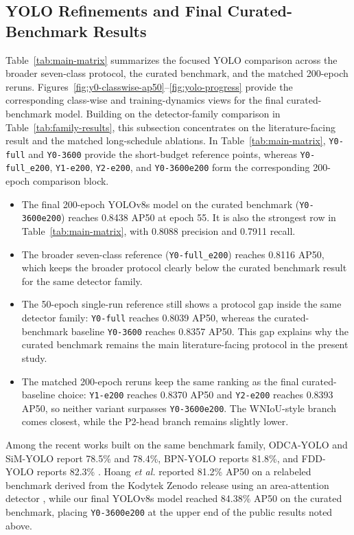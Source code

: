 \documentclass[10pt,a4paper]{article}
\begin{document}
\subsection{YOLO Refinements and Final Curated-Benchmark Results}
\label{sec:main-results}

Table~\ref{tab:main-matrix} summarizes the focused YOLO comparison across the broader seven-class protocol, the curated benchmark, and the matched 200-epoch reruns. Figures~\ref{fig:y0-classwise-ap50}--\ref{fig:yolo-progress} provide the corresponding class-wise and training-dynamics views for the final curated-benchmark model. Building on the detector-family comparison in Table~\ref{tab:family-results}, this subsection concentrates on the literature-facing result and the matched long-schedule ablations. In Table~\ref{tab:main-matrix}, \texttt{Y0-full} and \texttt{Y0-3600} provide the short-budget reference points, whereas \texttt{Y0-full\_e200}, \texttt{Y1-e200}, \texttt{Y2-e200}, and \texttt{Y0-3600e200} form the corresponding 200-epoch comparison block.

\begin{itemize}[leftmargin=1.5em]
  \item The final 200-epoch YOLOv8s model on the curated benchmark (\texttt{Y0-3600e200}) reaches 0.8438 AP50 at epoch 55. It is also the strongest row in Table~\ref{tab:main-matrix}, with 0.8088 precision and 0.7911 recall.
  \item The broader seven-class reference (\texttt{Y0-full\_e200}) reaches 0.8116 AP50, which keeps the broader protocol clearly below the curated benchmark result for the same detector family.
  \item The 50-epoch single-run reference still shows a protocol gap inside the same detector family: \texttt{Y0-full} reaches 0.8039 AP50, whereas the curated-benchmark baseline \texttt{Y0-3600} reaches 0.8357 AP50. This gap explains why the curated benchmark remains the main literature-facing protocol in the present study.
  \item The matched 200-epoch reruns keep the same ranking as the final curated-baseline choice: \texttt{Y1-e200} reaches 0.8370 AP50 and \texttt{Y2-e200} reaches 0.8393 AP50, so neither variant surpasses \texttt{Y0-3600e200}. The WNIoU-style branch comes closest, while the P2-head branch remains slightly lower.
\end{itemize}

Among the recent works built on the same benchmark family, ODCA-YOLO and SiM-YOLO report 78.5\% and 78.4\%, BPN-YOLO reports 81.8\%, and FDD-YOLO reports 82.3\% \citep{odca_yolo,bpn_yolo,sim_yolo,fdd_yolo}. Hoang \textit{et al.} reported 81.2\% AP50 on a relabeled benchmark derived from the Kodytek Zenodo release using an area-attention detector \citep{cmc_wood_area_attention}, while our final YOLOv8s model reached 84.38\% AP50 on the curated benchmark, placing \texttt{Y0-3600e200} at the upper end of the public results noted above.
\end{document}
